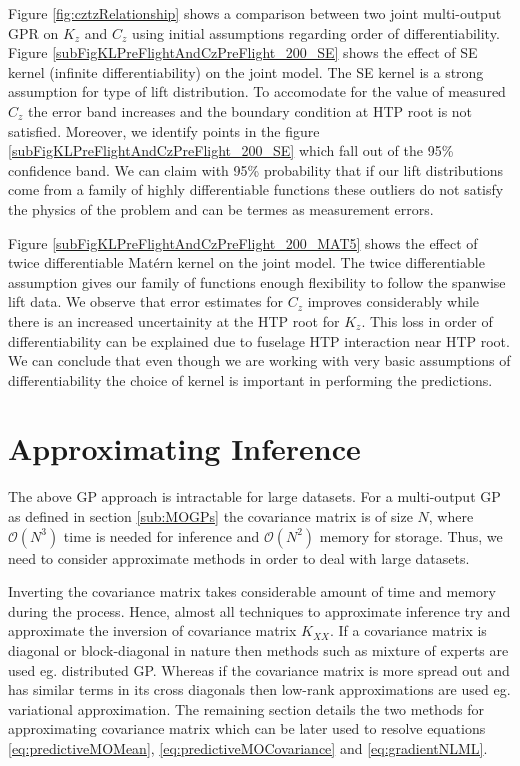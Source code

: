 Figure \ref{fig:cztzRelationship} shows a comparison between two joint multi-output GPR on \(K_{z}\) and \(C_{z}\) using initial assumptions regarding order of differentiability. Figure \ref{subFigKLPreFlightAndCzPreFlight_200_SE} shows the effect of SE kernel (infinite differentiability) on the joint model. The SE kernel is a strong assumption for type of lift distribution. To accomodate for the value of measured \(C_{z}\) the error band increases and the boundary condition at HTP root is not satisfied. Moreover, we identify points in the figure \ref{subFigKLPreFlightAndCzPreFlight_200_SE} which fall out of the 95\% confidence band. We can claim with 95\% probability that if our lift distributions come from a family of highly differentiable functions these outliers do not satisfy the physics of the problem and can be termes as measurement errors.

Figure \ref{subFigKLPreFlightAndCzPreFlight_200_MAT5} shows the effect of twice differentiable Mat\'ern kernel on the joint model. The twice differentiable assumption gives our family of functions enough flexibility to follow the spanwise lift data. We observe that error estimates for \(C_{z}\) improves considerably while there is an increased uncertainity at the HTP root for \(K_{z}\). This loss in order of differentiability can be explained due to fuselage HTP interaction near HTP root. We can conclude that even though we are working with very basic assumptions of differentiability the choice of kernel is important in performing the predictions. 


\section{Approximating Inference}\label{sec:sparseGPRegression}
\noindent The above GP approach is intractable for large datasets. For a multi-output GP as defined in section \ref{sub:MOGPs} the covariance matrix is of size \(N\),  where \(\mathcal{O}\left ( N^{3} \right )\) time is needed for inference and \(\mathcal{O}\left ( N^{2} \right )\) memory for storage. Thus, we need to consider approximate methods in order to deal with large datasets. 

Inverting the covariance matrix takes considerable amount of time and memory during the process. Hence, almost all techniques to approximate inference try and approximate the inversion of covariance matrix \(K_{XX}\). If a covariance matrix is diagonal or block-diagonal in nature then methods such as mixture of experts are used eg. distributed GP. Whereas if the covariance matrix is more spread out and has similar terms in its cross diagonals then low-rank approximations are used eg. variational approximation. The remaining section details the two methods for approximating covariance matrix which can be later used to resolve equations \ref{eq:predictiveMOMean}, \ref{eq:predictiveMOCovariance} and \ref{eq:gradientNLML}.

